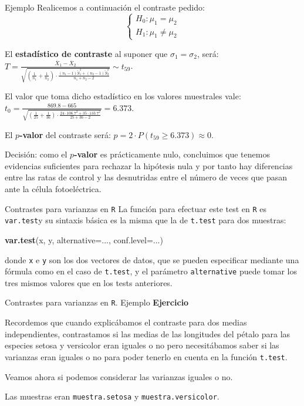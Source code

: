 \documentclass[
  ignorenonframetext,
]{beamer}
\newenvironment{Shaded}{\begin{snugshade}}{\end{snugshade}}
\newcommand{\DataTypeTok}[1]{\textcolor[rgb]{0.13,0.29,0.53}{#1}}
\newcommand{\KeywordTok}[1]{\textcolor[rgb]{0.13,0.29,0.53}{\textbf{#1}}}
\newcommand{\NormalTok}[1]{#1}
\begin{document}
\begin{frame}{Ejemplo}
\protect\hypertarget{ejemplo-55}{}
Realicemos a continuación el contraste pedido: \[
\left\{\begin{array}{l}
H_0:\mu_1=\mu_2\\
H_1:\mu_1\neq \mu_2
\end{array}\right.
\]

El \textbf{estadístico de contraste} al suponer que
\(\sigma_1= \sigma_2\), será:
\(T=\frac{\overline{X}_1-\overline{X}_2} {\sqrt{(\frac1{n_1}+\frac1{n_2})\cdot \frac{(n_1-1)\widetilde{S}_1^2+(n_2-1)\widetilde{S}_2^2} {n_1+n_2-2}}}\sim t_{59}\).

El valor que toma dicho estadístico en los valores muestrales vale:
\(t_0=\frac{869.8-665}{\sqrt{(\frac1{25}+\frac1{36})\cdot \frac{24\cdot 106.7^2+35\cdot 133.7^2} {25+36-2}}}=6.373.\)

El \textbf{\(p\)-valor} del contraste será:
\(p=2\cdot P(t_{59}\geq 6.373)\approx 0.\)

Decisión: como el \textbf{\(p\)-valor} es prácticamente nulo, concluimos
que tenemos evidencias suficientes para rechazar la hipótesis nula y por
tanto hay diferencias entre las ratas de control y las desnutridas entre
el número de veces que pasan ante la célula fotoeléctrica.
\end{frame}

\begin{frame}[fragile]{Contrastes para varianzas en \texttt{R}}
\protect\hypertarget{contrastes-para-varianzas-en-r}{}
La función para efectuar este test en \texttt{R} es \texttt{var.test}y
su sintaxis básica es la misma que la de \texttt{t.test} para dos
muestras:

\begin{Shaded}
\begin{Highlighting}[]
\KeywordTok{var.test}\NormalTok{(x, y, }\DataTypeTok{alternative=}\NormalTok{..., }\DataTypeTok{conf.level=}\NormalTok{...)}
\end{Highlighting}
\end{Shaded}

donde \texttt{x} e \texttt{y} son los dos vectores de datos, que se
pueden especificar mediante una fórmula como en el caso de
\texttt{t.test}, y el parámetro \texttt{alternative} puede tomar los
tres mismos valores que en los tests anteriores.
\end{frame}

\begin{frame}[fragile]{Contrastes para varianzas en \texttt{R}. Ejemplo}
\protect\hypertarget{contrastes-para-varianzas-en-r.-ejemplo}{}
\textbf{Ejercicio}

Recordemos que cuando explicábamos el contraste para dos medias
independientes, contrastamos si las medias de las longitudes del pétalo
para las especies setosa y versicolor eran iguales o no pero
necesitábamos saber si las varianzas eran iguales o no para poder
tenerlo en cuenta en la función \texttt{t.test}.

Veamos ahora si podemos considerar las varianzas iguales o no.

Las muestras eran \texttt{muestra.setosa} y \texttt{muestra.versicolor}.
\end{frame}
\end{document}

